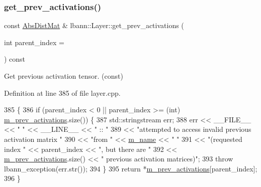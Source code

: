 \subsubsection{\texorpdfstring{get\+\_\+prev\+\_\+activations()}{get\_prev\_activations()}\hspace{0.1cm}{\footnotesize\ttfamily [2/2]}}
{\footnotesize\ttfamily const \hyperlink{base_8hpp_a9a697a504ae84010e7439ffec862b470}{Abs\+Dist\+Mat} \& lbann\+::\+Layer\+::get\+\_\+prev\+\_\+activations (\begin{DoxyParamCaption}\item[{int}]{parent\+\_\+index = {} }\end{DoxyParamCaption}) const}

Get previous activation tensor. (const) 

Definition at line 385 of file layer.\+cpp.


\begin{DoxyCode}
385                                                                     \{
386   \textcolor{keywordflow}{if} (parent\_index < 0 || parent\_index >= (\textcolor{keywordtype}{int}) \hyperlink{classlbann_1_1Layer_a52314601c3458268f56e017dc2ade357}{m\_prev\_activations}.size()) \{
387     std::stringstream err;
388     err << \_\_FILE\_\_ << \textcolor{stringliteral}{" "} << \_\_LINE\_\_ << \textcolor{stringliteral}{" :: "}
389         << \textcolor{stringliteral}{"attempted to access invalid previous activation matrix "}
390         << \textcolor{stringliteral}{"from "} << \hyperlink{classlbann_1_1Layer_aa47109ad09b399142fa92f9d3702189f}{m\_name} << \textcolor{stringliteral}{" "}
391         << \textcolor{stringliteral}{"(requested index "} << parent\_index << \textcolor{stringliteral}{", but there are "}
392         << \hyperlink{classlbann_1_1Layer_a52314601c3458268f56e017dc2ade357}{m\_prev\_activations}.size() << \textcolor{stringliteral}{" previous activation matrices)"};
393     \textcolor{keywordflow}{throw} lbann\_exception(err.str());
394   \}
395   \textcolor{keywordflow}{return} *\hyperlink{classlbann_1_1Layer_a52314601c3458268f56e017dc2ade357}{m\_prev\_activations}[parent\_index];
396 \}
\end{DoxyCode}
\mbox{\label{classlbann_1_1Layer_a7ac4579d3c1671dfaf86e3b618d6938a}} 
